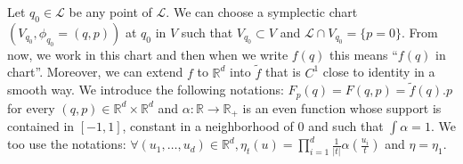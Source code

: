 \documentclass{dcds}
\theoremstyle{definition}
\begin{document}
 Let $q_0\in{\mathcal {L}}$ be any point of ${\mathcal {L}}$. We can choose a symplectic chart $(V_{q_0}, \phi_{q_0}=(q,p))$ at $q_0$ in $V$  such that $V_{q_0}\subset V$ and ${\mathcal {L}}\cap V_{q_0}=\{ p=0\}$. From now, we work in this chart and then when we write $f(q)$ this means ``$f(q)$ in chart''. Moreover, we can extend $f$ to ${\mathbb {R}}^d$ into $\tilde f$ that is $C^1$ close to identity in a smooth way. We introduce the following notations:
 $F_p(q)=F(q,p)=\tilde f(q).p$ for every $(q, p)\in {\mathbb {R}}^d\times {\mathbb {R}}^d$  and $\alpha:{\mathbb {R}}\rightarrow {\mathbb {R}}_+$ is an even function whose support is contained in $[-1, 1]$, constant in a neighborhood of $0$ and such that $\int\alpha=1$. We too use the notations: $\displaystyle{\forall (u_1, \dots, u_d)\in{\mathbb {R}}^d, \eta_t(u)=\prod_{i=1}^d\frac{1}{|t|}\alpha(\frac{u_i}{t})}$ and $\eta=\eta_1$.
\end{document}
